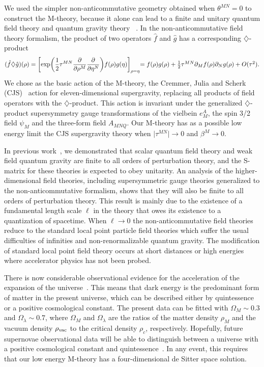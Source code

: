 \documentclass[a4paper,12pt]{article}
\begin{document}
We used the simpler non-anticommutative
geometry obtained when $\theta^{MN}=0$ to construct the M-theory,
because it alone can lead to a finite and unitary quantum field theory and
quantum gravity theory ~\cite{Moffat2,Moffat3,Moffat4}.
In the non-anticommutative field theory formalism, the product of two
operators ${\hat f}$ and ${\hat g}$ has a corresponding
$\diamondsuit$-product
\begin{equation}
\label{diamondproduct}
({\hat f}\diamondsuit {\hat g})(\rho)
=\biggl[\exp\biggr(\frac{1}{2}\tau^{MN}\frac{\partial}{\partial\rho^M}\frac{\partial}
{\partial\eta^N}\biggr)f(\rho)g(\eta)\biggr]_{\rho=\eta} $$ $$
=f(\rho)g(\rho)+\frac{1}{2}\tau^{MN}\partial_M f(\rho)\partial_N
g(\rho)+O(\tau^2).
\end{equation}
We chose as the basic action of the
M-theory, the Cremmer, Julia and Scherk (CJS)~\cite{Julia} action for
eleven-dimensional supergravity, replacing all products of field operators
with the $\diamondsuit$-product. This action is invariant under the
generalized $\diamondsuit$-product supersymmetry gauge transformations of
the vielbein $e^A_M$, the spin 3/2 field $\psi_M$ and the three-form field
$A_{MNQ}$. Our M-theory has as a possible low energy limit the CJS
supergravity theory when $\vert\tau^{MN}\vert\rightarrow 0$ and
$\beta^M\rightarrow 0$.

In previous work~\cite{Moffat2,Moffat3,Moffat4}, we
demonstrated that scalar quantum field theory and weak field quantum
gravity are finite to all orders of perturbation theory, and the S-matrix
for these theories is expected to obey unitarity. An analysis of the
higher-dimensional field theories, including supersymmetric gauge
theories generalized to the non-anticommutative formalism, shows that they
will also be finite to all orders of perturbation theory. This result is
mainly due to the existence of a fundamental length scale $\ell$ in the
theory that owes its existence to a quantization of spacetime. When
$\ell\rightarrow 0$ the non-anticommutative field theories reduce to the
standard local point particle field theories which suffer the usual
difficulties of infinities and non-renormalizable quantum gravity. The
modification of standard local point field theory occurs at short
distances or high energies where accelerator physics has not been probed.

There is now considerable observational evidence for the acceleration of
the expansion of the universe~\cite{Perlmutter}. This means that dark
energy is the predominant form of matter in the present universe, which
can be described either by quintessence~\cite{Caldwell} or a positive
cosmological constant. The present data can be fitted with $\Omega_M\sim
0.3$ and $\Omega_{\lambda}\sim 0.7$, where $\Omega_M$ and
$\Omega_{\lambda}$ are the ratios of the matter density $\rho_M$ and the
vacuum density $\rho_{\rm vac}$ to the
critical density $\rho_c$, respectively. Hopefully, future supernovae
observational data will be able to distinguish between a universe with a
positive cosmological constant and quintessence~\cite{Copeland}. In any
event, this requires that our low energy M-theory has a four-dimensional de
Sitter space solution.
\end{document}
